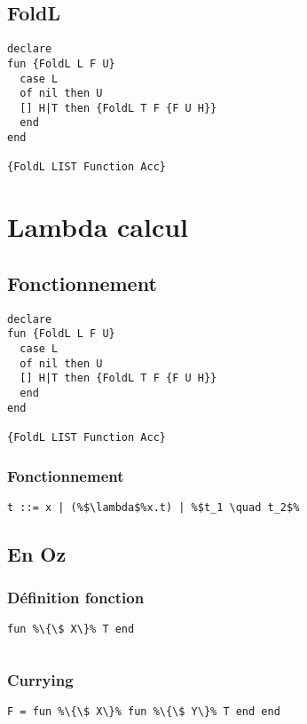 \documentclass{report}
\begin{document}
\subsection{FoldL}
\begin{lstlisting}
declare
fun {FoldL L F U}
  case L
  of nil then U
  [] H|T then {FoldL T F {F U H}}
  end
end

{FoldL LIST Function Acc}
\end{lstlisting}

\section{Lambda calcul}
\subsection{Fonctionnement}
\begin{lstlisting}
declare
fun {FoldL L F U}
  case L
  of nil then U
  [] H|T then {FoldL T F {F U H}}
  end
end

{FoldL LIST Function Acc}
\end{lstlisting}

\subsubsection{Fonctionnement}
\begin{lstlisting}[escapechar=\%]
t ::= x | (%$\lambda$%x.t) | %$t_1 \quad t_2$%
\end{lstlisting}

\subsection{En Oz}
\subsubsection{Définition fonction}
\begin{lstlisting}[escapechar=\%]
fun %\{\$ X\}% T end
\end{lstlisting}
\begin{lstlisting}[escapechar=\%]
%\{$T_1 \quad T_2$\}%
\end{lstlisting}

\subsubsection{Currying}
\begin{lstlisting}[escapechar=\%]
F = fun %\{\$ X\}% fun %\{\$ Y\}% T end end
\end{lstlisting}
\begin{lstlisting}[escapechar=\%]
%\{\{F X\} Y\}%
\end{lstlisting}
\end{document}
